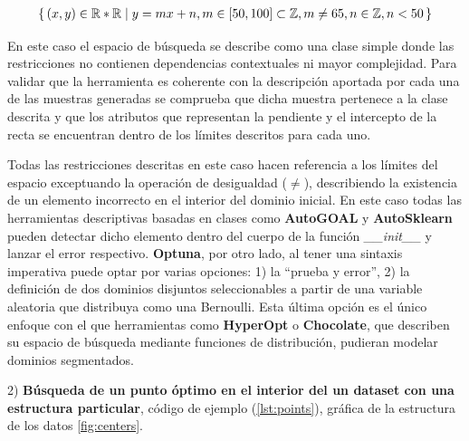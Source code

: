 \begin{align*}
      \{\,(x, y) \in \mathbb{R} * \mathbb{R}\mid y = mx + n,
      \space m \in [50, 100] \subset \mathbb{Z},\space m \neq 65,
      \space n \in \mathbb{Z},\space n < 50\,\} \\
\end{align*}

En este caso el espacio de búsqueda se describe como una clase simple donde las restricciones
no contienen dependencias contextuales ni mayor complejidad. Para validar que la herramienta es
coherente con la descripción aportada por cada una de las muestras generadas se comprueba que dicha
muestra pertenece a la clase descrita y que los atributos que representan la pendiente y el intercepto
de la recta se encuentran dentro de los límites descritos para cada uno.

Todas las restricciones descritas en este caso hacen referencia a los límites del espacio exceptuando
la operación de desigualdad ($\neq$), describiendo la existencia de un elemento incorrecto en el interior del
dominio inicial. En este caso todas las herramientas descriptivas basadas en clases como {\bf AutoGOAL} y
      {\bf AutoSklearn} pueden detectar dicho elemento dentro del cuerpo de la función {\it \_\_init\_\_} y lanzar el error
respectivo. {\bf Optuna}, por otro lado, al tener una sintaxis imperativa puede optar por varias opciones:
1) la ``prueba y error'', 2) la definición de dos dominios disjuntos seleccionables a partir de
una variable aleatoria que distribuya como una Bernoulli. Esta última opción es el único enfoque con el 
que herramientas como {\bf HyperOpt} o {\bf Chocolate}, que describen su espacio de búsqueda mediante funciones de
distribución, pudieran modelar dominios segmentados.


2) {\bf Búsqueda de un punto óptimo en el interior del un dataset con una estructura particular}, 
código de ejemplo (\ref{lst:points}), gráfica de la estructura de los datos \ref{fig:centers}. 

